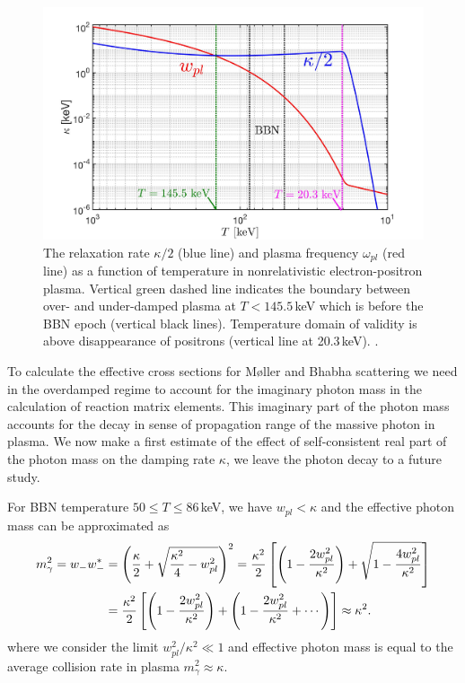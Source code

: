 \begin{figure}  
\centerline{\includegraphics[width=0.9\linewidth]{./plots/KappaElectronPhotonMass_Talk}}
\caption{The relaxation rate $\kappa/2$ (blue line) and plasma frequency $\omega_{pl}$ (red line) as a function of temperature in nonrelativistic electron-positron plasma. Vertical green dashed line indicates the boundary between over- and under-damped plasma at  $T<145.5$\,keV  which is before the BBN epoch (vertical black lines). Temperature domain of validity is above disappearance of positrons (vertical line at 20.3\,keV). .}
\label{RelaxationRate002:fig} 
\end{figure}

To calculate the effective cross sections for  M{\o}ller and Bhabha scattering we need in the overdamped regime to account for the imaginary photon mass in the calculation of reaction matrix elements. This imaginary part of the photon mass accounts for the decay in sense  of propagation range of the massive photon in plasma. We now make a first estimate of the effect of self-consistent real part of the photon mass on the damping rate $\kappa$, we leave the photon decay to a future study.

For BBN temperature $50\leqslant T\leqslant 86$\,keV,
we have $w_{pl}<\kappa$ and the effective photon mass can be approximated as
\begin{align}
m^2_\gamma=w_-w_-^\ast&=\left(\frac{\kappa}{2}+\sqrt{\frac{\kappa^2}{4}-w^2_{pl}}\right)^2
=\frac{\kappa^2}{2}\left[\left(1-\frac{2w^2_{pl}}{\kappa^2}\right)+\sqrt{1-\frac{4w^2_{pl}}{\kappa^2}}\right]\notag\\
&=\frac{\kappa^2}{2}\left[\left(1-\frac{2w^2_{pl}}{\kappa^2}\right)+\left(1-\frac{2w^2_{pl}}{\kappa^2}+\cdots\right)\right]\approx\kappa^2.
\label{PhotonMassPlasma002}
\end{align}
where we consider the limit $w^2_{pl}/\kappa^2\ll 1$ and effective photon mass is equal to the average collision rate in plasma $m^2_\gamma\approx\kappa$.

